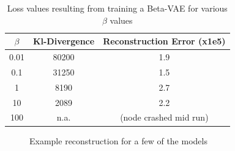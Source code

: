 \begin{table}[!ht]
    \centering
    \caption{Loss values resulting from training a Beta-VAE for various $\beta$ values}
    \label{tab:vae-backbones}
    \begin{tabular}{ccc}
        \hline
        $\beta$ & Kl-Divergence & Reconstruction Error (x1e5) \\
        \hline
        0.01    & 80200         & 1.9                         \\
        0.1     & 31250         & 1.5                         \\
        1       & 8190          & 2.7                         \\
        10      & 2089          & 2.2                         \\
        100     & n.a.          & (node crashed mid run)      \\
        \hline
    \end{tabular}
\end{table}

\begin{figure}[!ht]
    \centering
    \caption{Example reconstruction for a few of the models}
    \label{fig:vae-backbones}
     \quad
\end{figure}


